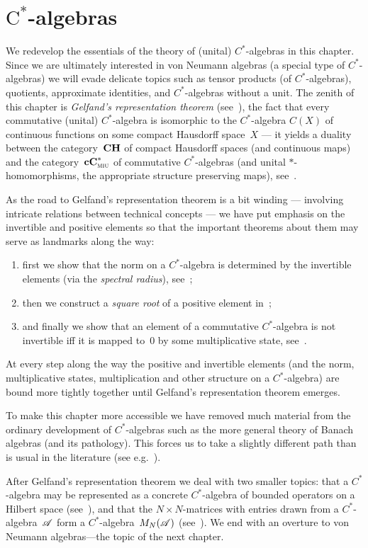 \chapter{$\text{C}^*$-algebras}
\begin{parsec}{20}
\begin{point}{10}
We redevelop the essentials of the theory of (unital) $C^*$-algebras
in this chapter.
Since we are ultimately interested
in von Neumann algebras
(a special type of $C^*$-algebras)
we will evade
delicate
topics such as tensor products (of $C^*$-algebras), 
quotients, approximate identities,
and $C^*$-algebras without a unit.
The zenith of this chapter
is \emph{Gelfand's representation theorem} (see~),
the fact that every commutative (unital) $C^*$-algebra
is isomorphic
to the $C^*$-algebra
$C(X)$ of continuous functions on some compact Hausdorff space~$X$
--- it yields a duality
	between the category~$\mathbf{CH}$
	of compact Hausdorff spaces (and continuous maps)
and the category~$\mathbf{cC}^*_{\text{\textsc{miu}}}$ of commutative $C^*$-algebras (and
unital $*$-homomorphisms,
the appropriate structure preserving maps), see~.

As the road to Gelfand's representation theorem 
is a bit winding ---
involving intricate relations between technical concepts --- 
we have put emphasis on the invertible and  positive elements
so that the important
theorems about them may serve as landmarks along the way:
\begin{enumerate}
\item
first we show that the norm
on a $C^*$-algebra
is determined by the invertible elements
(via the \emph{spectral radius}), see~;

\item
then we construct a \emph{square root} of a positive element in~;

\item
and finally we
show that an element of a commutative $C^*$-algebra
is not invertible iff it is mapped to~$0$
by some multiplicative state, see~.
\end{enumerate}
At every step along the way
the positive and invertible elements 
(and the norm, multiplicative states, multiplication
and other structure on a $C^*$-algebra)
are bound more tightly together
until Gelfand's representation theorem emerges.

To make this chapter
more accessible
we have removed
much material
from the ordinary development
of $C^*$-algebras
such as the more general theory of Banach algebras
(and its pathology).
This forces us
to take a slightly different path than is usual in the literature 
(see e.g.~).

After Gelfand's representation theorem
we deal with two smaller topics:
that a $C^*$-algebra
may be represented as a concrete $C^*$-algebra
of bounded operators on a Hilbert space (see~),
and that the $N\times N$-matrices with entries drawn from a 
$C^*$-algebra~$\mathscr{A}$
form a $C^*$-algebra~$M_N(\mathscr{A})$
(see~).
We end
with an overture to von Neumann algebras---the
topic of the next chapter.
\end{point}%
\end{parsec}
